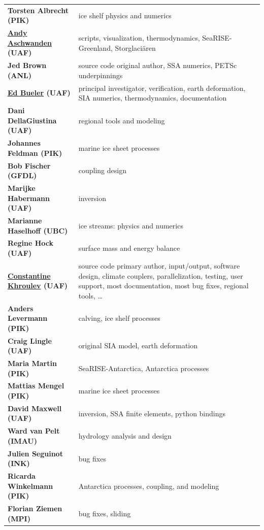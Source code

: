 \documentclass[titlepage,letterpaper,final]{scrartcl}
\begin{document}
\renewcommand{\arraystretch}{1.3}
\begin{tabular}{ll}
\textbf{Torsten Albrecht (PIK)} & ice shelf physics and numerics \\
\textbf{\underline{Andy Aschwanden} (UAF)} & \begin{minipage}[t]{4in} scripts, visualization, thermodynamics, SeaRISE-Greenland, Storglaci\"aren  \end{minipage}  \\
\textbf{Jed Brown (ANL)} & source code original author, SSA numerics, PETSc underpinnings \\
\textbf{\underline{Ed Bueler} (UAF)} & \begin{minipage}[t]{4in} principal investigator, verification, earth deformation, SIA numerics, thermodynamics, documentation  \end{minipage} \\
\textbf{Dani DellaGiustina (UAF)} & regional tools and modeling \\
\textbf{Johannes Feldman (PIK)} & marine ice sheet processes \\
\textbf{Bob Fischer (GFDL)} & coupling design \\
\textbf{Marijke Habermann (UAF)} & inversion\\
\textbf{Marianne Haselhoff (UBC)} & ice streams: physics and numerics\\
\textbf{Regine Hock (UAF)} & surface mass and energy balance \\
\textbf{\underline{Constantine Khroulev} (UAF)} & \begin{minipage}[t]{4in} source code primary author, input/output, software design, climate couplers, parallelization, testing, user support, most documentation, most bug fixes, regional tools, \dots \end{minipage} \\
\textbf{Anders Levermann (PIK)} & calving, ice shelf processes \\
\textbf{Craig Lingle (UAF)} & original SIA model, earth deformation \\
\textbf{Maria Martin (PIK)} & SeaRISE-Antarctica, Antarctica processes \\
\textbf{Mattias Mengel (PIK)} & marine ice sheet processes \\
\textbf{David Maxwell (UAF)} & inversion, SSA finite elements, python bindings \\
\textbf{Ward van Pelt (IMAU)} & hydrology analysis and design \\
\textbf{Julien Seguinot (INK)} & bug fixes \\
\textbf{Ricarda Winkelmann (PIK)} & Antarctica processes, coupling, and modeling  \\
\textbf{Florian Ziemen (MPI)} & bug fixes, sliding \\
\end{tabular}
\end{document}
